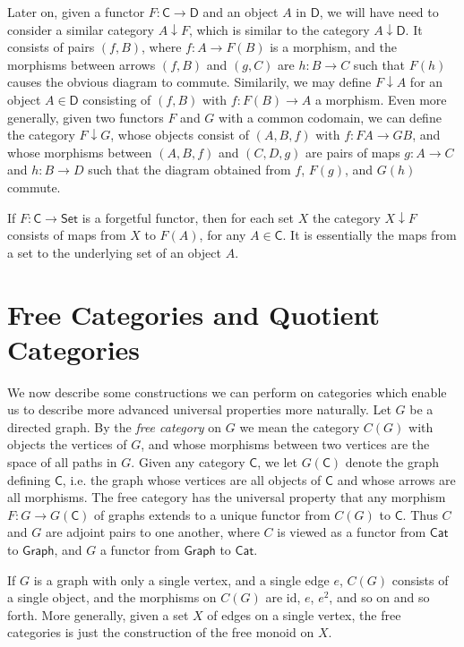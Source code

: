Later on, given a functor $F: \mathsf{C} \to \mathsf{D}$ and an object $A$ in $\mathsf{D}$, we will have need to consider a similar category $A \downarrow F$, which is similar to the category $A \downarrow \mathsf{D}$. It consists of pairs $(f,B)$, where $f: A \to F(B)$ is a morphism, and the morphisms between arrows $(f,B)$ and $(g,C)$ are $h: B \to C$ such that $F(h)$ causes the obvious diagram to commute. Similarily, we may define $F \downarrow A$ for an object $A \in \mathsf{D}$ consisting of $(f,B)$ with $f: F(B) \to A$ a morphism. Even more generally, given two functors $F$ and $G$ with a common codomain, we can define the category $F \downarrow G$, whose objects consist of $(A,B,f)$ with $f: FA \to GB$, and whose morphisms between $(A,B,f)$ and $(C,D,g)$ are pairs of maps $g: A \to C$ and $h: B \to D$ such that the diagram obtained from $f$, $F(g)$, and $G(h)$ commute.

\begin{example}
    If $F: \mathsf{C} \to \mathsf{Set}$ is a forgetful functor, then for each set $X$ the category $X \downarrow F$ consists of maps from $X$ to $F(A)$, for any $A \in \mathsf{C}$. It is essentially the maps from a set to the underlying set of an object $A$.
\end{example}

\section{Free Categories and Quotient Categories}

We now describe some constructions we can perform on categories which enable us to describe more advanced universal properties more naturally. Let $G$ be a directed graph. By the \emph{free category} on $G$ we mean the category $C(G)$ with objects the vertices of $G$, and whose morphisms between two vertices are the space of all paths in $G$. Given any category $\mathsf{C}$, we let $G(\mathsf{C})$ denote the graph defining $\mathsf{C}$, i.e. the graph whose vertices are all objects of $\mathsf{C}$ and whose arrows are all morphisms. The free category has the universal property that any morphism $F: G \to G(\mathsf{C})$ of graphs extends to a unique functor from $C(G)$ to $\mathsf{C}$. Thus $C$ and $G$ are adjoint pairs to one another, where $C$ is viewed as a functor from $\mathsf{Cat}$ to $\mathsf{Graph}$, and $G$ a functor from $\mathsf{Graph}$ to $\mathsf{Cat}$.

\begin{example}
    If $G$ is a graph with only a single vertex, and a single edge $e$, $C(G)$ consists of a single object, and the morphisms on $C(G)$ are $\text{id}$, $e$, $e^2$, and so on and so forth. More generally, given a set $X$ of edges on a single vertex, the free categories is just the construction of the free monoid on $X$.
\end{example}

